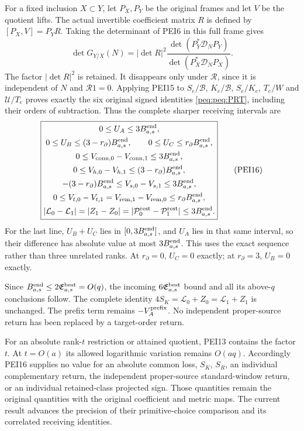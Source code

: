 For a fixed inclusion $X\subset Y$, let $P_X,P_Y$ be the original
frames and let $V$ be the quotient lifts. The actual invertible
coefficient matrix $R$ is defined by $[P_X,V]=P_YR$.
Taking the determinant of PEI6 in this full frame gives
\[
 \det G_{Y/X}(N)=|\det R|^2
   \frac{\det(P_Y^*\mathcal D_NP_Y)}
        {\det(P_X^*\mathcal D_NP_X)}.                            \tag{PEI15}
\]
The factor $|\det R|^2$ is retained. It disappears only under
$\mathcal R$, since it is independent of $N$ and $\mathcal R1=0$.
Applying PEI15 to $S_e/\mathscr B$, $K_e/\mathscr B$,
$S_e/K_e$, $T_e/W$ and $\mathcal U/T_e$ proves exactly the
six original signed identities \eqref{peq:peq:PRT}, including their
orders of subtraction. Thus the complete sharper receiving intervals are
\[
 \boxed{\begin{gathered}
 0\le U_A\le3B^{\rm end}_{a,s},\\
 0\le U_B\le(3-r_\partial)B^{\rm end}_{a,s},\qquad
 0\le U_C\le r_\partial B^{\rm end}_{a,s},\\
 0\le V_{{\rm conn},0}-V_{{\rm conn},1}\le3B^{\rm end}_{a,s},\\
 0\le V_{h,0}-V_{h,1}\le(3-r_\partial)B^{\rm end}_{a,s},\\
 -(3-r_\partial)B^{\rm end}_{a,s}
       \le V_{s,0}-V_{s,1}\le3B^{\rm end}_{a,s},\\
 0\le V_{t,0}-V_{t,1}
      =V_{{\rm rem},1}-V_{{\rm rem},0}
      \le r_\partial B^{\rm end}_{a,s},\\
 |\mathcal L_0-\mathcal L_1|
   =|Z_1-Z_0|
   =|\mathcal P^{\rm rest}_0-\mathcal P^{\rm rest}_1|
   \le3B^{\rm end}_{a,s}.
 \end{gathered}}                                                 \tag{PEI16}
\]
For the last line, $U_B+U_C$ lies in $[0,3B^{\rm end}_{a,s}]$,
and $U_A$ lies in that same interval, so their difference has
absolute value at most $3B^{\rm end}_{a,s}$. This uses the exact
sequence rather than three unrelated ranks. At $r_\partial=0$,
$U_C=0$ exactly; at $r_\partial=3$, $U_B=0$ exactly.

Since $B^{\rm end}_{a,s}\le2\mathfrak E^{\rm best}_{a,s}=O(q)$,
the incoming $6\mathfrak E^{\rm best}_{a,s}$ bound and all its
above-$q$ conclusions follow. The complete identity
$4S_K=\mathcal L_0+Z_0=\mathcal L_1+Z_1$ is unchanged.
The prefix term remains $-V_A^{\rm prefix}$. No independent
proper-source return has been replaced by a target-order return.

For an absolute rank-$t$ restriction or attained quotient, PEI13
contains the factor $t$. At $t=O(a)$ its allowed logarithmic
variation remains $O(aq)$. Accordingly PEI16 supplies no value
for an absolute common loss, $S_K$, $S_R$, an individual complementary
return, the independent proper-source standard-window return, or an
individual retained-class projected sign. Those quantities remain
the original quantities with the original coefficient and metric maps.
The current result advances the precision of their primitive-choice
comparison and its correlated receiving identities.


